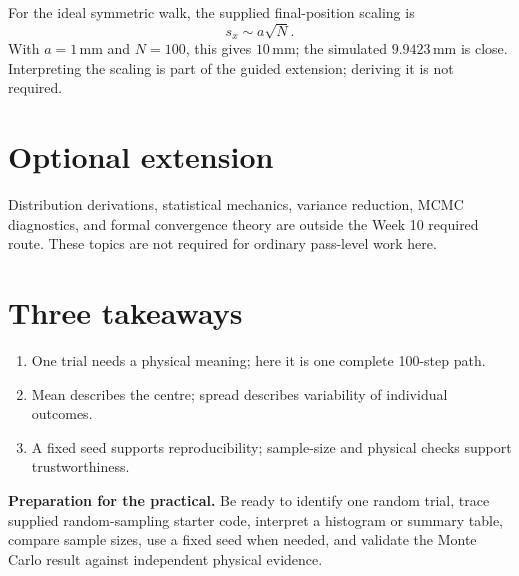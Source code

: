 \documentclass[11pt,a4paper]{article}
\newcommand{\units}[1]{\,\mathrm{#1}}
\begin{document}
For the ideal symmetric walk, the supplied final-position scaling is
\[
s_x\sim a\sqrt{N}.
\]
With $a=1\units{mm}$ and $N=100$, this gives $10\units{mm}$; the simulated $9.9423\units{mm}$ is close. Interpreting the scaling is part of the guided extension; deriving it is not required.

\section*{Optional extension}
Distribution derivations, statistical mechanics, variance reduction, MCMC diagnostics, and formal convergence theory are outside the Week 10 required route. These topics are not required for ordinary pass-level work here.

\section*{Three takeaways}
\begin{enumerate}[nosep,leftmargin=7mm]
\item One trial needs a physical meaning; here it is one complete 100-step path.
\item Mean describes the centre; spread describes variability of individual outcomes.
\item A fixed seed supports reproducibility; sample-size and physical checks support trustworthiness.
\end{enumerate}

\begin{keybox}\textbf{Preparation for the practical.} Be ready to identify one random trial, trace supplied random-sampling starter code, interpret a histogram or summary table, compare sample sizes, use a fixed seed when needed, and validate the Monte Carlo result against independent physical evidence.\end{keybox}
\end{document}
